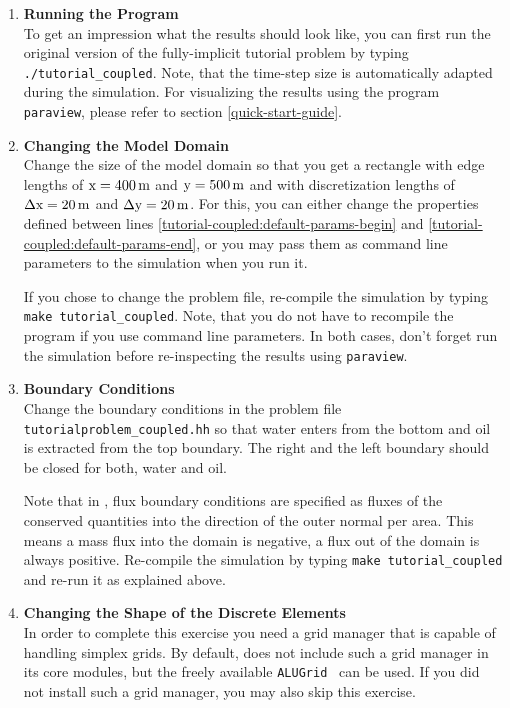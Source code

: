 \begin{enumerate}

\item \textbf{Running the Program} \\
  To get an impression what the results should look like, you can first run the original version of 
the fully-implicit tutorial problem by typing  \texttt{./tutorial\_coupled}. 
Note, that the time-step size is automatically adapted during the simulation. 
For visualizing the results using the program \texttt{paraview}, please refer to section \ref{quick-start-guide}.

\item \textbf{Changing the Model Domain} \\
  Change the size of the model domain so that you get a rectangle with
  edge lengths of $\text{x} = \unit[400]{m}$ and $\text{y} =
  \unit[500]{m}$ and with discretization lengths of $\Delta \text{x} =
  \unit[20]{m}$ and $\Delta \text{y} = \unit[20]{m}$. For this, you can
  either change the properties defined between lines
  \ref{tutorial-coupled:default-params-begin} and
  \ref{tutorial-coupled:default-params-end}, or you may pass them as
  command line parameters to the simulation when you run it.

  If you chose to change the problem file, re-compile the simulation
  by typing \texttt{make tutorial\_coupled}.  Note, that you do not
  have to recompile the program if you use command line parameters. In
  both cases, don't forget run the simulation before re-inspecting the
  results using \texttt{paraview}.
  
\item \textbf{Boundary Conditions} \\
  Change the boundary conditions in the problem file
  \texttt{tutorialproblem\_coupled.hh} so that water enters from the
  bottom and oil is extracted from the top boundary. The right and the
  left boundary should be closed for both, water and oil. 

  Note that in \eWoms, flux boundary conditions are specified as
  fluxes of the conserved quantities into the direction of the outer
  normal per area. This means a mass flux into the domain is negative,
  a flux out of the domain is always positive. Re-compile the
  simulation by typing \texttt{make tutorial\_coupled} and re-run it
  as explained above.

\item \textbf{Changing the Shape of the Discrete Elements} \\
  In order to complete this exercise you need a \Dune grid manager
  that is capable of handling simplex grids. By default, \Dune does
  not include such a grid manager in its core modules, but the freely
  available \texttt{ALUGrid}~\cite{ALUGRID-HP} can be used. If you did
  not install such a grid manager, you may also skip this exercise.


\end{enumerate}
